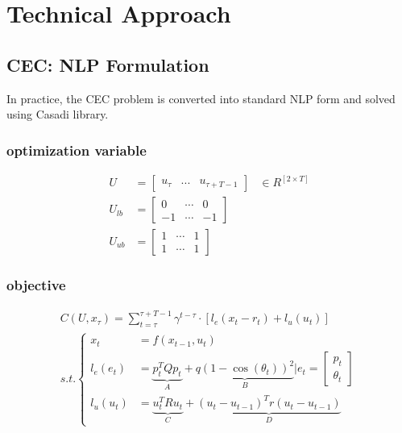 \documentclass[conference]{IEEEtran}
\begin{document}
\section{Technical Approach}

\subsection{CEC: NLP Formulation}
In practice, the CEC problem is converted into standard NLP form and solved using Casadi library.

\subsubsection{optimization variable}
\[
\begin{aligned}
U&=\left[ \begin{matrix}u_{\tau }&...&u_{\tau +T-1}\end{matrix}  \right] &\in R^{[2\times T]}\\ 
U_{lb}&=\left[ \begin{matrix}0&\cdots &0\\ -1&\cdots &-1\end{matrix}  \right] \\ 
U_{ub}&=\left[ \begin{matrix}1&\cdots &1\\ 1&\cdots &1\end{matrix}  \right] 
\end{aligned} 
\]

\subsubsection{objective}
\[
\begin{gathered}
C(U, x_\tau)=\sum^{\tau +T-1}_{t=\tau } \gamma^{t-\tau } \cdot \left[l_{e}\left( x_{t}-r_{t} \right) +l_{u}\left( u_{t} \right)  \right] 
\\ 
s.t. \left\{\begin{aligned}
x_{t}&=f(x_{t-1},u_{t})\\ 
l_{e}(e_{t})&=\underbrace{p^{T}_{t}Qp_{t}}_{A} +\underbrace{q\left( 1-\cos \left( \theta_{t}  \right)  \right)^{2} }_{B} \bigg|e_{t}=\left[ \begin{gathered}p_{t}\\ \theta_{t} \end{gathered}  \right] \\ 
l_{u}(u_{t})&=\underbrace{u^{T}_{t}Ru_{t}}_{C} +\underbrace{\left( u_{t}-u_{t-1} \right)^{T} r\left( u_{t}-u_{t-1} \right) }_{D} \
\end{aligned} \right.
\end{gathered}
\]
\end{document}
